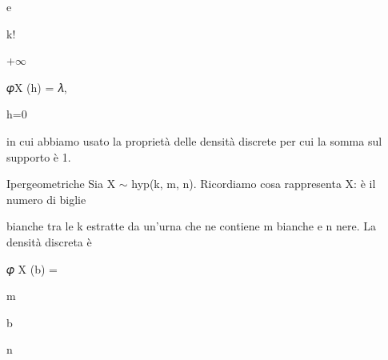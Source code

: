 \documentclass[a4paper,portrait,12pt]{article}
\begin{document}
\begin{flushleft}
e
\end{flushleft}


\begin{flushleft}
k!
\end{flushleft}





+$\infty$





\begin{flushleft}
𝜑X (h) = 𝜆,
\end{flushleft}


\begin{flushleft}
h=0
\end{flushleft}





\begin{flushleft}
in cui abbiamo usato la propriet\`{a} delle densit\`{a} discrete per cui la somma sul supporto \`{e} 1.
\end{flushleft}





\begin{flushleft}
Ipergeometriche Sia X $\sim$ hyp(k, m, n). Ricordiamo cosa rappresenta X: \`{e} il numero di biglie
\end{flushleft}


\begin{flushleft}
bianche tra le k estratte da un'urna che ne contiene m bianche e n nere. La densit\`{a} discreta \`{e}
\end{flushleft}


\begin{flushleft}
𝜑 X (b) =
\end{flushleft}





\begin{flushleft}
m
\end{flushleft}


\begin{flushleft}
b
\end{flushleft}





\begin{flushleft}
n
\end{flushleft}
\end{document}
